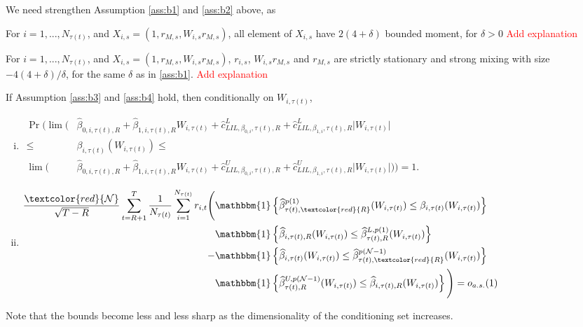 We need strengthen Assumption \ref{ass:b1} and \ref{ass:b2} above, as
\begin{assumption}
\label{ass:b3}
For $i = 1, ..., N_{\tau(t)}$, and $X_{i,s} = (1, r_{M,s}, W_{i,s} r_{M,s})$, all element of $X_{i,s}$ have $2(4 + \delta)$ bounded moment, for $\delta > 0$ \textcolor{red}{Add explanation}
\end{assumption}
\begin{assumption}
\label{ass:b4}
For $i = 1, ..., N_{\tau(t)}$, and $X_{i,s} = (1, r_{M,s}, W_{i,s} r_{M,s})$, $r_{i,s}$, $W_{i,s}r_{M,s}$ and $r_{M,s}$ are strictly stationary and strong mixing with size $-4(4 + \delta) / \delta$, for the same $\delta$ as in \ref{ass:b1}. \textcolor{red}{Add explanation}
\end{assumption}

\begin{proposition}
If Assumption \ref{ass:b3} and \ref{ass:b4} hold, then conditionally on $W_{i,\tau(t)}$,
\begin{enumerate}[(i)]
\item 
$\begin{aligned}
    \Pr \Big( \lim \Big( &\widehat{\beta}_{0,i,\tau(t),R} + \widehat{\beta}_{1,i,\tau(t),R}W_{i,\tau(t)} + \widehat{c}_{LIL,\beta_{0,i},\tau(t),R}^L + \widehat{c}_{LIL,\beta_{1,i},\tau(t),R}^L \lvert W_{i,\tau(t)} \rvert \\
    \leq &\beta_{i,\tau(t)} ( W_{i,\tau(t)} ) \leq \\
    \lim \Big( &\widehat{\beta}_{0,i,\tau(t),R} + \widehat{\beta}_{1,i,\tau(t),R}W_{i,\tau(t)} + \widehat{c}_{LIL,\beta_{0,i},\tau(t),R}^U + \widehat{c}_{LIL,\beta_{1,i},\tau(t),R}^U \lvert W_{i,\tau(t)} \rvert \Big) \Big) = 1.
\end{aligned}$ 
\item
$\begin{aligned}
    \frac{\textcolor{red}{\mathcal{N}}}{\sqrt{T - R}} \sum_{t=R+1}^{T} \frac{1}{N_{\tau(t)}} \sum_{i=1}^{N_{\tau(t)}} r_{i,t} \Bigg( & \mathbbm{1} \left\{ \widehat{\beta}_{\tau(t),\textcolor{red}{R}}^{p(1)} ( W_{i,\tau(t)} ) \leq \beta_{i,\tau(t)} ( W_{i,\tau(t)} ) \right\} \\
    & \mathbbm{1} \left\{ \widehat{\beta}_{i,\tau(t),R} ( W_{i,\tau(t)} ) \leq \widehat{\beta}_{\tau(t),R}^{L,p(1)} ( W_{i,\tau(t)} ) \right\} \notag \\
    - & \mathbbm{1} \left\{ \widehat{\beta}_{i,\tau(t)} ( W_{i,\tau(t)} ) \leq \widehat{\beta}_{\tau(t),\textcolor{red}{R}}^{p(\mathcal{N}-1)} ( W_{i,\tau(t)} ) \right\} \notag \\
    & \mathbbm{1} \left\{ \widehat{\beta}_{\tau(t),R}^{U,p(\mathcal{N}-1)} ( W_{i,\tau(t)} ) \leq \widehat{\beta}_{i,\tau(t),R} ( W_{i,\tau(t)} ) \right\} \Bigg) = o_{a.s.}(1) \notag
\end{aligned}$ 
\end{enumerate}
\end{proposition}
Note that the bounds become less and less sharp as the dimensionality of the conditioning set increases.

